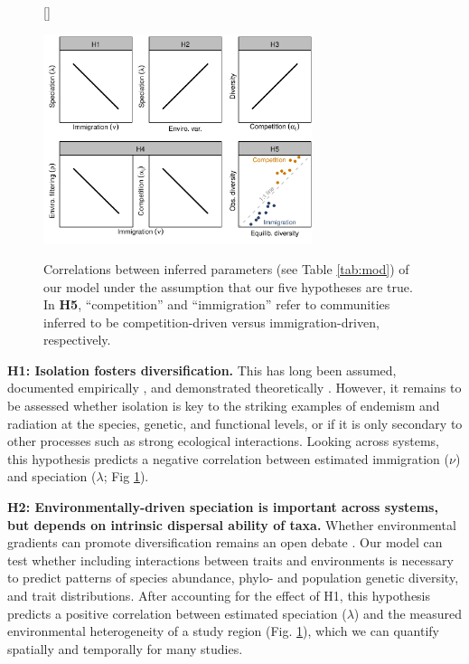 \documentclass[11pt]{article}
\begin{document}
\begin{figure}[htb]
[\FBwidth]
{\caption{Correlations between inferred parameters (see Table
\ref{tab:mod}) of our model under the assumption that our five
hypotheses are true. In {\bf H5}, ``competition'' and ``immigration''
refer to communities inferred to be competition-driven versus
immigration-driven, respectively.}\label{fig:hyp}}
{\includegraphics[width=0.7\textwidth]{../fig_hyp.pdf}}
\end{figure}


\textbf{H1: Isolation fosters diversification.} This has long been
assumed, documented empirically \cite{Losos2000-xp,Wagner2014-qm}, and
demonstrated theoretically \cite{Rosindell2011-od}. However, it remains
to be assessed whether isolation is key to the striking examples of
endemism and radiation at the species, genetic, and functional levels,
or if it is only secondary to other processes such as strong ecological
interactions. Looking across systems, this hypothesis predicts a
negative correlation between estimated immigration ($\nu$) and
speciation ($\lambda$; Fig \ref{fig:hyp}).

\textbf{H2: Environmentally-driven speciation is important across
  systems, but depends on intrinsic dispersal ability of taxa.}
Whether environmental gradients can promote diversification remains an
open debate \cite{Mittelbach2007-ui, Ogden2002-jb, Rundle2005-ll}. Our
model can test whether including interactions between traits and
environments is necessary to predict patterns of species abundance,
phylo- and population genetic diversity, and trait
distributions. After accounting for the effect of H1, this hypothesis
predicts a positive correlation between estimated speciation
($\lambda$) and the measured environmental heterogeneity of a study
region (Fig. \ref{fig:hyp}), which we can quantify spatially and
temporally for many studies.
\end{document}
